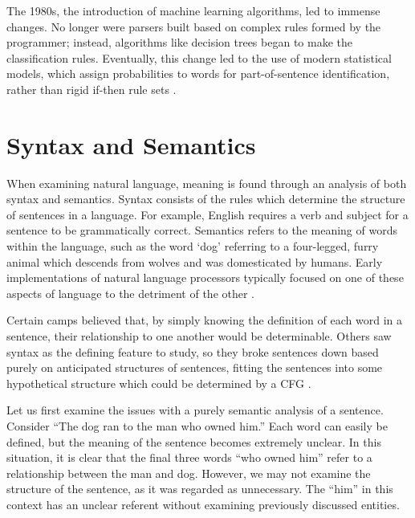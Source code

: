 The 1980s, the introduction of machine learning algorithms, led to immense changes. No longer were parsers built based on complex rules formed by the programmer; instead, algorithms like decision trees began to make the classification rules. Eventually, this change led to the use of modern statistical models, which assign probabilities to words for part-of-sentence identification, rather than rigid if-then rule sets \cite{1980}.

\section{Syntax and Semantics}

When examining natural language, meaning is found through an analysis of both syntax and semantics. Syntax consists of the rules which determine the structure of sentences in a language. For example, English requires a verb and subject for a sentence to be grammatically correct. Semantics refers to the meaning of words within the language, such as the word `dog' referring to a four-legged, furry animal which descends from wolves and was domesticated by humans. Early implementations of natural language processors typically focused on one of these aspects of language to the detriment of the other \cite{lytinen}.

Certain camps believed that, by simply knowing the definition of each word in a sentence, their relationship to one another would be determinable. Others saw syntax as the defining feature to study, so they broke sentences down based purely on anticipated structures of sentences, fitting the sentences into some hypothetical structure which could be determined by a CFG \cite{lytinen}.

Let us first examine the issues with a purely semantic analysis of a sentence. Consider ``The dog ran to the man who owned him.'' Each word can easily be defined, but the meaning of the sentence becomes extremely unclear. In this situation, it is clear that the final three words ``who owned him'' refer to a relationship between the man and dog. However, we may not examine the structure of the sentence, as it was regarded as unnecessary. The ``him'' in this context has an unclear referent without examining previously discussed entities. \label{issues}

